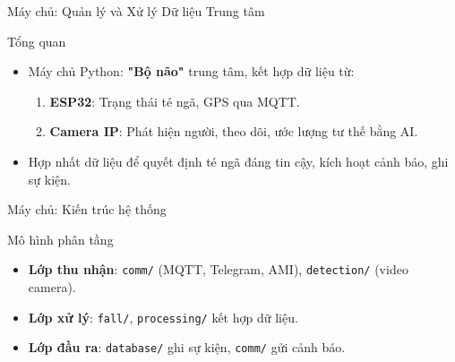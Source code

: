 \begin{frame}{Máy chủ: Quản lý và Xử lý Dữ liệu Trung tâm}
    \begin{block}{Tổng quan}
        \begin{itemize}
            \item Máy chủ Python: \textbf{"Bộ não"} trung tâm, kết hợp dữ liệu từ:
            \begin{enumerate}
                \item \textbf{ESP32}: Trạng thái té ngã, GPS qua MQTT.
                \item \textbf{Camera IP}: Phát hiện người, theo dõi, ước lượng tư thế bằng AI.
            \end{enumerate}
            \item Hợp nhất dữ liệu để quyết định té ngã đáng tin cậy, kích hoạt cảnh báo, ghi sự kiện.
        \end{itemize}
    \end{block}
    \label{sec:server_overview}
\end{frame}

\begin{frame}{Máy chủ: Kiến trúc hệ thống}
    \begin{block}{Mô hình phân tầng}
        \begin{itemize}
            \item \textbf{Lớp thu nhận}: \texttt{comm/} (MQTT, Telegram, AMI), \texttt{detection/} (video camera).
            \item \textbf{Lớp xử lý}: \texttt{fall/}, \texttt{processing/} kết hợp dữ liệu.
            \item \textbf{Lớp đầu ra}: \texttt{database/} ghi sự kiện, \texttt{comm/} gửi cảnh báo.
        \end{itemize}
    \end{block}
    \label{subsubsec:system_overview}
\end{frame}


